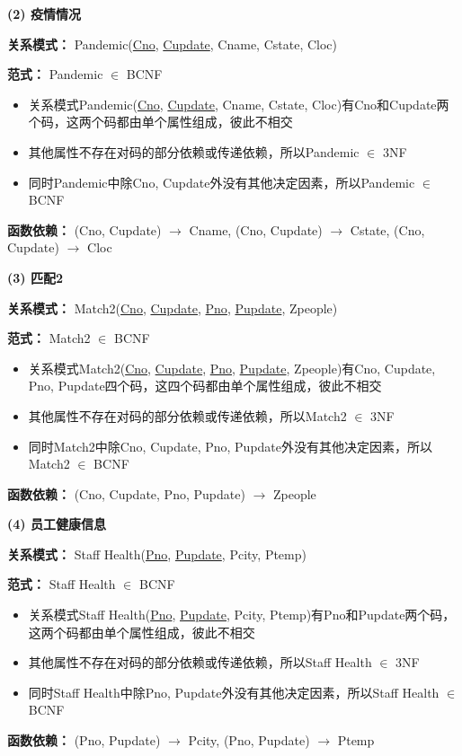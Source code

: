 \documentclass[12pt]{article}
\begin{document}
\vspace{0.3cm}
\noindent \textbf{(2) 疫情情况} \par 
\noindent \textbf{关系模式：} Pandemic(\uline{Cno}, \uline{Cupdate}, Cname, Cstate, Cloc) \par 
\noindent \textbf{范式：} Pandemic $\in$ BCNF \par 
\begin{itemize}
	\item 关系模式Pandemic(\uline{Cno}, \uline{Cupdate}, Cname, Cstate, Cloc)有Cno和Cupdate两个码，这两个码都由单个属性组成，彼此不相交
	\item 其他属性不存在对码的部分依赖或传递依赖，所以Pandemic $\in$ 3NF
	\item 同时Pandemic中除Cno, Cupdate外没有其他决定因素，所以Pandemic $\in$ BCNF
\end{itemize}
\textbf{函数依赖：} (Cno, Cupdate) $\rightarrow$ Cname, (Cno, Cupdate) $\rightarrow$ Cstate, (Cno, Cupdate) $\rightarrow$ Cloc

\vspace{0.3cm}
\noindent \textbf{(3) 匹配2} \par 
\noindent \textbf{关系模式：} Match2(\uline{Cno}, \uline{Cupdate}, \uline{Pno}, \uline{Pupdate}, Zpeople) \par 
\noindent \textbf{范式：} Match2 $\in$ BCNF \par 
\begin{itemize}
	\item 关系模式Match2(\uline{Cno}, \uline{Cupdate}, \uline{Pno}, \uline{Pupdate}, Zpeople)有Cno, Cupdate, Pno, Pupdate四个码，这四个码都由单个属性组成，彼此不相交
	\item 其他属性不存在对码的部分依赖或传递依赖，所以Match2 $\in$ 3NF
	\item 同时Match2中除Cno, Cupdate, Pno, Pupdate外没有其他决定因素，所以Match2 $\in$ BCNF
\end{itemize}
\textbf{函数依赖：} (Cno, Cupdate, Pno, Pupdate) $\rightarrow$ Zpeople

\vspace{0.3cm}
\noindent \textbf{(4) 员工健康信息} \par 
\noindent \textbf{关系模式：} Staff Health(\uline{Pno}, \uline{Pupdate}, Pcity, Ptemp) \par 
\noindent \textbf{范式：} Staff Health $\in$ BCNF \par
\begin{itemize}
	\item 关系模式Staff Health(\uline{Pno}, \uline{Pupdate}, Pcity, Ptemp)有Pno和Pupdate两个码，这两个码都由单个属性组成，彼此不相交
	\item 其他属性不存在对码的部分依赖或传递依赖，所以Staff Health $\in$ 3NF
	\item 同时Staff Health中除Pno, Pupdate外没有其他决定因素，所以Staff Health $\in$ BCNF
\end{itemize} 
\textbf{函数依赖：} (Pno, Pupdate) $\rightarrow$ Pcity, (Pno, Pupdate) $\rightarrow$ Ptemp
\end{document}
